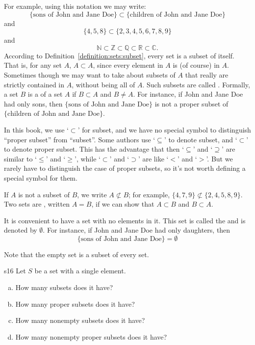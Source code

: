 For example, using this notation we may write:
\[
\{\text{sons of John and Jane Doe}\} \subset \{\text{children of John and Jane Doe\}}
\]
and 
\[
\{4,5,8\} \subset \{2, 3, 4, 5, 6, 7, 8, 9 \}
\]
and
\[
{\mathbb N} \subset {\mathbb Z} \subset {\mathbb Q} \subset {\mathbb R} \subset {\mathbb C}.
\]
According to Definition~\ref{definition:sets:subset}, every set is a subset of itself.  That is, for any set $A$, $A \subset A$, since every element in $A$ is (of course) in $A$.  Sometimes though we may want to take about subsets of $A$ that really are strictly contained in $A$, without being all of $A$. Such subsets are called . Formally, a set $B$ is a  of a set $A$ if $B \subset A$ and $B \neq A$. For instance, if John and Jane Doe had only sons, then
$\{\textrm{sons of John and Jane Doe}\}$ is not a proper subset of $\{\textrm{children of John and Jane Doe}\}$.

\begin{rem} 
In this book, we use `$\subset$' for subset, and we have no special symbol to distinguish ``proper subset'' from ``subset''.
Some authors use  `$\subseteq$' to denote  subset, and  `$\subset$' to denote proper subset. This has the advantage that then `$\subseteq$' and `$\supseteq$' are similar to `$\le$' and `$\ge$', while `$\subset$' and `$\supset$' are like `$<$' and `$>$'.
But we rarely have to distinguish the case of proper subsets, so it's not worth defining a special symbol for them.
\end{rem}

If $A$ is not a subset of $B$, we write $A \not \subset B$; for example, $\{4, 7, 9\} \not \subset \{2, 4, 5,  8, 9 \}$.  Two sets are , written $A = B$, if we can show that $A \subset B$ and $B \subset A$.  

It is convenient to have a set with no elements in it.  This set is called the  and is denoted by $\emptyset$\label{theemptyset}.  For instance, if John and Jane Doe had only daughters, then
\[
\mbox{\{sons of John and Jane Doe\}} = \emptyset
\]

Note that the empty set is a subset of every set.  

\begin{exercise}{s16}
Let $S$ be a set with a single element.
\begin{enumerate}[(a)]
\item
How many subsets does it have?
\item
How many proper subsets does it have?
\item
How many nonempty subsets does it have?
\item
How many nonempty proper subsets does it have?
\end{enumerate}
\end{exercise}


